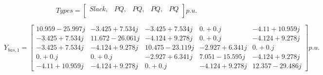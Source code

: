 \documentclass[nols,a4paper,twoside,notoc,fleqn]{tufte-book}
\begin{document}
$$
Types = \left[ \begin{array}{ccccc}
Slack, & PQ,  & PQ, & PQ,  & PQ \\
\end{array} \right] p.u.
$$


$$
Y_{bus,1} = \left[ \begin{array}{ccccc}
10.959-25.997j & -3.425 +7.534j & -3.425 +7.534j &  0.    +0.   j & -4.11 +10.959j\\
-3.425 +7.534j & 11.672-26.061j & -4.124 +9.278j &  0.    +0.   j & -4.124 +9.278j\\
-3.425 +7.534j & -4.124 +9.278j & 10.475-23.119j & -2.927 +6.341j &  0.    +0.   j\\
 0.    +0.   j &  0.    +0.   j & -2.927 +6.341j &  7.051-15.595j & -4.124 +9.278j\\
-4.11 +10.959j & -4.124 +9.278j &  0.    +0.   j & -4.124 +9.278j & 12.357-29.486j

\end{array} \right] p.u.
$$



\backmatter





\printindex
\end{document}
